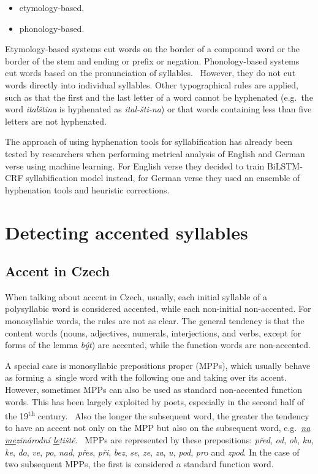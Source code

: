 \begin{itemize}
    \item etymology-based,
    \item phonology-based.
\end{itemize}

Etymology-based systems cut words on the border of a compound word or the border of the stem and ending or prefix or negation. Phonology-based systems cut words based on the pronunciation of syllables.~\cite{TowardsUniversalHypenation} However, they do not cut words directly into individual syllables. Other typographical rules are applied, such as that the first and the last letter of a word cannot be hyphenated (e.g.~the word \emph{italština} is hyphenated as \emph{ital-šti-na}) or that words containing less than five letters are not hyphenated.~\cite{HyphenateBatchelder}

The approach of using hyphenation tools for syllabification has already been tested by researchers when performing metrical analysis of English and German verse using machine learning. For English verse they decided to train BiLSTM-CRF syllabification model instead, for German verse they used an ensemble of hyphenation tools and heuristic corrections.~\cite{MetricalTaggingInTheWild}

\pagebreak

\section{Detecting accented syllables}
\subsection{Accent in Czech}
When talking about accent in Czech, usually, each initial syllable of a polysyllabic word is considered accented, while each non-initial non-accented. For monosyllabic words, the rules are not as clear. The general tendency is that the content words (nouns, adjectives, numerals, interjections, and verbs, except for forms of the lemma \emph{být}) are accented, while the function words are non-accented.

A special case is monosyllabic prepositions proper (MPPs), which usually behave as forming a~single word with the following one and taking over its accent. However, sometimes MPPs can also be used as standard non-accented function words. This has been largely exploited by poets, especially in the second half of the 19\textsuperscript{th} century.~\cite{KVETA} Also the longer the subsequent word, the greater the tendency to have an accent not only on the MPP but also on the subsequent word, e.g.~\emph{\uline{na} \uline{me}zinárodní \uline{le}tiště}.~\cite{UvodTeorieVerse} MPPs are represented by these prepositions: \emph{před}, \emph{od}, \emph{ob}, \emph{ku}, \emph{ke}, \emph{do}, \emph{ve}, \emph{po}, \emph{nad}, \emph{přes}, \emph{při}, \emph{bez}, \emph{se}, \emph{ze}, \emph{za}, \emph{u}, \emph{pod}, \emph{pr}o and \emph{zpod}. In the case of two subsequent MPPs, the first is considered a standard function word.~\cite{KVETA}

